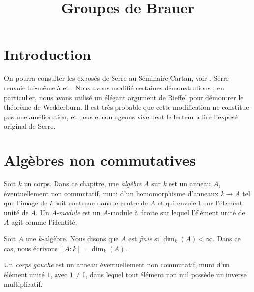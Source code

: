 

%


\title{Groupes de Brauer}


\maketitle

\label{section-phantom}

\tableofcontents

\section{Introduction}
\label{section-introduction}

\noindent
On pourra consulter les exposés de Serre au Séminaire Cartan, voir
\cite{Serre-Cartan}. Serre renvoie lui-même à
\cite{Deuring} et \cite{ANT}. Nous avons modifié certaines démonstrations ; en particulier,
nous avons utilisé un élégant argument de Rieffel pour démontrer le théorème de Wedderburn.
Il est très probable que cette modification ne constitue pas une amélioration, et nous
encourageons vivement le lecteur à lire l'exposé original de Serre.


\section{Algèbres non commutatives}
\label{section-algebras}

\noindent
Soit $k$ un corps. Dans ce chapitre, une {\it algèbre} $A$ sur $k$ est
un anneau $A$, éventuellement non commutatif, muni d'un homomorphisme d'anneaux
$k \to A$ tel que l'image de $k$ soit contenue dans le centre de $A$ et qui
envoie $1$ sur l'élément unité de $A$. Un {\it $A$-module} est un
$A$-module à droite sur lequel l'élément unité de $A$ agit comme l'identité.

\begin{definition}
\label{definition-finite}
Soit $A$ une $k$-algèbre. Nous disons que $A$ est {\it finie} si $\dim_k(A) < \infty$.
Dans ce cas, nous écrivons $[A : k] = \dim_k(A)$.
\end{definition}

\begin{definition}
\label{definition-skew-field}
Un {\it corps gauche} est un anneau éventuellement non commutatif, muni d'un élément unité
$1$, avec $1 \not = 0$, dans lequel tout élément non nul
possède un inverse multiplicatif.
\end{definition}

